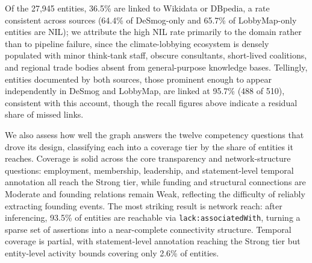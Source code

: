 Of the 27,945 entities, 36.5\% are linked to Wikidata or DBpedia, a rate consistent across sources (64.4\% of DeSmog-only and 65.7\% of LobbyMap-only entities are NIL); we attribute the high NIL rate primarily to the domain rather than to pipeline failure, since the climate-lobbying ecosystem is densely populated with minor think-tank staff, obscure consultants, short-lived coalitions, and regional trade bodies absent from general-purpose knowledge bases.
Tellingly, entities documented by both sources, those prominent enough to appear independently in DeSmog and LobbyMap, are linked at 95.7\% (488 of 510), consistent with this account, though the recall figures above indicate a residual share of missed links.

We also assess how well the graph answers the twelve competency questions that drove its design, classifying each into a coverage tier by the share of entities it reaches.
Coverage is solid across the core transparency and network-structure questions: employment, membership, leadership, and statement-level temporal annotation all reach the Strong tier, while funding and structural connections are Moderate and founding relations remain Weak, reflecting the difficulty of reliably extracting founding events.
The most striking result is network reach: after inferencing, 93.5\% of entities are reachable via \texttt{lack:associatedWith}, turning a sparse set of assertions into a near-complete connectivity structure.
Temporal coverage is partial, with statement-level annotation reaching the Strong tier but entity-level activity bounds covering only 2.6\% of entities.

